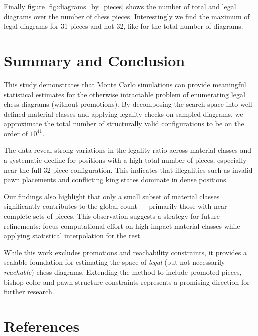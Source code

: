 \documentclass[12pt]{article}
\begin{document}
Finally figure \ref{fig:diagrams_by_pieces} shows the number of total and legal diagrams over the number of chess pieces. Interestingly we find the maximum of legal diagrams for 31 pieces and not 32, like for the total number of diagrams.

\section{Summary and Conclusion}

This study demonstrates that Monte Carlo simulations can provide meaningful statistical estimates for the otherwise intractable problem of enumerating legal chess diagrams (without promotions). By decomposing the search space into well-defined material classes and applying legality checks on sampled diagrams, we approximate the total number of structurally valid configurations to be on the order of $10^{41}$.

The data reveal strong variations in the legality ratio across material classes and a systematic decline for positions with a high total number of pieces, especially near the full 32-piece configuration. This indicates that illegalities such as invalid pawn placements and conflicting king states dominate in dense positions.

Our findings also highlight that only a small subset of material classes significantly contributes to the global count — primarily those with near-complete sets of pieces. This observation suggests a strategy for future refinements: focus computational effort on high-impact material classes while applying statistical interpolation for the rest.

While this work excludes promotions and reachability constraints, it provides a scalable foundation for estimating the space of \emph{legal} (but not necessarily \emph{reachable}) chess diagrams. Extending the method to include promoted pieces, bishop color and pawn structure constraints represents a promising direction for further research.

\section{References}
\end{document}
